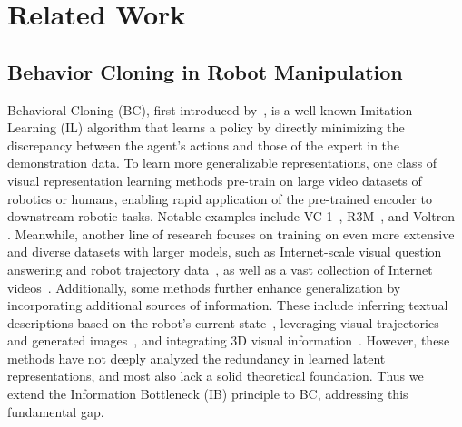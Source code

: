 \section{Related Work}
\label{sec:rw}

\subsection{Behavior Cloning in Robot Manipulation}

Behavioral Cloning (BC), first introduced by~\cite{pomerleau1991efficient}, is a well-known Imitation Learning (IL) algorithm that learns a policy by directly minimizing the discrepancy between the agent's actions and those of the expert in the demonstration data. 
To learn more generalizable representations, one class of visual representation learning methods pre-train on large video datasets of robotics or humans, enabling rapid application of the pre-trained encoder to downstream robotic tasks. Notable examples include VC-1~\cite{majumdar2023we}, R3M~\cite{nair2023r3m}, and Voltron~\cite{karamcheti2023language} . 
Meanwhile, another line of research focuses on training on even more extensive and diverse datasets with larger models, such as Internet-scale visual question answering and robot trajectory data~\cite{brohan2023rt}, as well as a vast collection of Internet videos~\cite{cheang2024gr}.
Additionally, some methods further enhance generalization by incorporating additional sources of information. These include inferring textual descriptions based on the robot's current state~\cite{zawalski2024robotic}, leveraging visual trajectories~\cite{wen2023any} and generated images~\cite{tian2025predictive}, and integrating 3D visual information~\cite{goyal2023rvt}.
However, these methods have not deeply analyzed the redundancy in learned latent representations, and most also lack a solid theoretical foundation. 
Thus we extend the Information Bottleneck (IB) principle to BC, addressing this fundamental gap.


